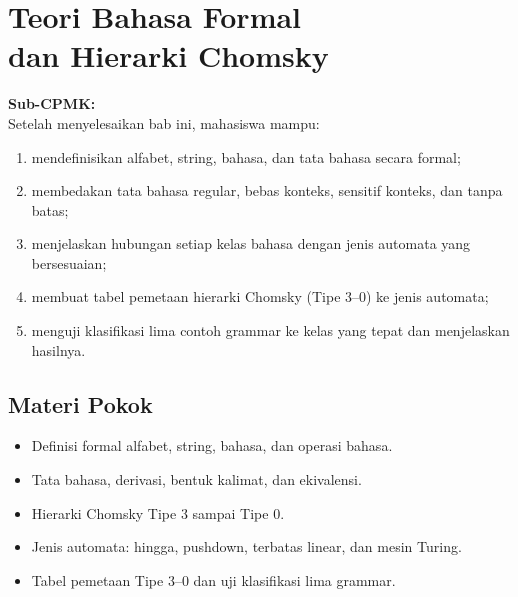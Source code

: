\documentclass[../../main.tex]{subfiles}
\begin{document}
\chapter[Teori Bahasa Formal dan Hierarki Chomsky]{Teori Bahasa Formal\\ dan Hierarki Chomsky}
\label{chap:bahasa-formal}

\begin{outcomebox}
\textbf{Sub-CPMK:} \\[3pt]
Setelah menyelesaikan bab ini, mahasiswa mampu:
\begin{enumerate}[label=\arabic*.,leftmargin=*]
  \item mendefinisikan alfabet, string, bahasa, dan tata bahasa secara
        formal;
  \item membedakan tata bahasa regular, bebas konteks, sensitif
        konteks, dan tanpa batas;
  \item menjelaskan hubungan setiap kelas bahasa dengan jenis automata
        yang bersesuaian;
  \item membuat tabel pemetaan hierarki Chomsky (Tipe 3--0) ke jenis
        automata;
  \item menguji klasifikasi lima contoh grammar ke kelas yang tepat
        dan menjelaskan hasilnya.
\end{enumerate}
\end{outcomebox}

\section*{Materi Pokok}
\begin{itemize}[leftmargin=*]
  \item Definisi formal alfabet, string, bahasa, dan operasi bahasa.
  \item Tata bahasa, derivasi, bentuk kalimat, dan ekivalensi.
  \item Hierarki Chomsky Tipe 3 sampai Tipe 0.
  \item Jenis automata: hingga, pushdown, terbatas linear, dan mesin
        Turing.
  \item Tabel pemetaan Tipe 3--0 dan uji klasifikasi lima grammar.
\end{itemize}















\ifSubfilesClassLoaded{%
}{}
\end{document}
